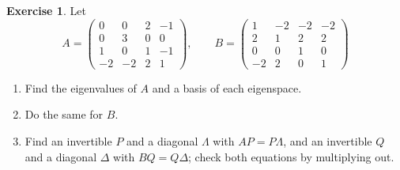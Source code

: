 \documentclass[12pt]{article}
\theoremstyle{definition}
\newtheorem{exercise}{Exercise}
\begin{document}
\begin{exercise}\label{r7-dr-eigenspaces}
Let
\[
A=\begin{pmatrix}0&0&2&-1\\0&3&0&0\\1&0&1&-1\\-2&-2&2&1\end{pmatrix},\qquad
B=\begin{pmatrix}1&-2&-2&-2\\2&1&2&2\\0&0&1&0\\-2&2&0&1\end{pmatrix}
\]
\begin{enumerate}
\item Find the eigenvalues of \(A\) and a basis of each eigenspace.
\item Do the same for \(B\).
\item Find an invertible \(P\) and a diagonal \(\Lambda\) with \(AP=P\Lambda\), and an invertible \(Q\) and a diagonal \(\Delta\)
with \(BQ=Q\Delta\); check both equations by multiplying out.
\end{enumerate}
\end{exercise}
\end{document}
